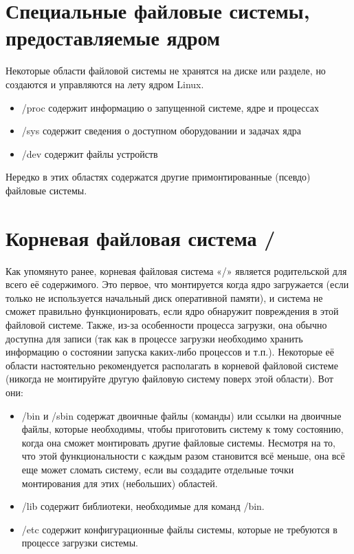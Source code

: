 \documentclass[10pt]{book}
\begin{document}
\section{Специальные файловые системы, предоставляемые ядром}

Некоторые области файловой системы не хранятся на диске или разделе, но создаются и управляются на лету ядром Linux.

\begin{itemize}
 \item /proc содержит информацию о запущенной системе, ядре и процессах
 \item /sys содержит сведения о доступном оборудовании и задачах ядра
 \item /dev содержит файлы устройств 
\end{itemize}

Нередко в этих областях содержатся другие примонтированные (псевдо) файловые системы.

\section {Корневая файловая система /}

Как упомянуто ранее, корневая файловая система «/» является родительской для всего её содержимого. Это первое, что монтируется когда ядро загружается (если только не используется начальный диск оперативной памяти), и система не сможет правильно функционировать, если ядро обнаружит повреждения в этой файловой системе. Также, из-за особенности процесса загрузки, она обычно доступна для записи (так как в процессе загрузки необходимо хранить информацию о состоянии запуска каких-либо процессов и т.п.).
Некоторые её области настоятельно рекомендуется располагать в корневой файловой системе (никогда не монтируйте другую файловую систему поверх этой области). Вот они:

\begin{itemize}
\item /bin и /sbin содержат двоичные файлы (команды) или ссылки на двоичные файлы, которые необходимы, чтобы приготовить систему к тому состоянию, когда она сможет монтировать другие файловые системы. Несмотря на то, что этой функциональности с каждым разом становится всё меньше, она всё еще может сломать систему, если вы создадите отдельные точки монтирования для этих (небольших) областей.
\item /lib содержит библиотеки, необходимые для команд  /bin.
\item /etc содержит конфигурационные файлы системы, которые не требуются в процессе загрузки системы.
\end{itemize}
\end{document}
